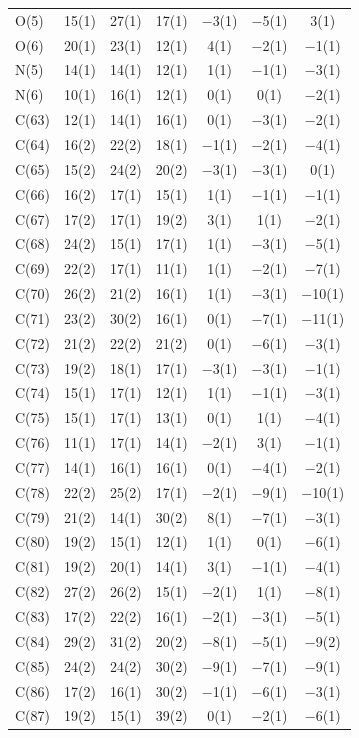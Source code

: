 \begin{center}
{\begin{supertabular}{lcccccc}
O(5)&15(1) &27(1)&17(1) &$-$3(1)&$-$5(1) &3(1)\\
O(6)&20(1) &23(1)&12(1) &4(1)&$-$2(1) &$-$1(1)\\
N(5)&14(1) &14(1)&12(1) &1(1)&$-$1(1) &$-$3(1)\\
N(6)&10(1) &16(1)&12(1) &0(1)&0(1) &$-$2(1)\\
C(63)&12(1) &14(1)&16(1) &0(1)&$-$3(1) &$-$2(1)\\
C(64)&16(2) &22(2)&18(1) &$-$1(1)&$-$2(1) &$-$4(1)\\
C(65)&15(2) &24(2)&20(2) &$-$3(1)&$-$3(1) &0(1)\\
C(66)&16(2) &17(1)&15(1) &1(1)&$-$1(1) &$-$1(1)\\
C(67)&17(2) &17(1)&19(2) &3(1)&1(1) &$-$2(1)\\
C(68)&24(2) &15(1)&17(1) &1(1)&$-$3(1) &$-$5(1)\\
C(69)&22(2) &17(1)&11(1) &1(1)&$-$2(1) &$-$7(1)\\
C(70)&26(2) &21(2)&16(1) &1(1)&$-$3(1) &$-$10(1)\\
C(71)&23(2) &30(2)&16(1) &0(1)&$-$7(1) &$-$11(1)\\
C(72)&21(2) &22(2)&21(2) &0(1)&$-$6(1) &$-$3(1)\\
C(73)&19(2) &18(1)&17(1) &$-$3(1)&$-$3(1) &$-$1(1)\\
C(74)&15(1) &17(1)&12(1) &1(1)&$-$1(1) &$-$3(1)\\
C(75)&15(1) &17(1)&13(1) &0(1)&1(1) &$-$4(1)\\
C(76)&11(1) &17(1)&14(1) &$-$2(1)&3(1) &$-$1(1)\\
C(77)&14(1) &16(1)&16(1) &0(1)&$-$4(1) &$-$2(1)\\
C(78)&22(2) &25(2)&17(1) &$-$2(1)&$-$9(1) &$-$10(1)\\
C(79)&21(2) &14(1)&30(2) &8(1)&$-$7(1) &$-$3(1)\\
C(80)&19(2) &15(1)&12(1) &1(1)&0(1) &$-$6(1)\\
C(81)&19(2) &20(1)&14(1) &3(1)&$-$1(1) &$-$4(1)\\
C(82)&27(2) &26(2)&15(1) &$-$2(1)&1(1) &$-$8(1)\\
C(83)&17(2) &22(2)&16(1) &$-$2(1)&$-$3(1) &$-$5(1)\\
C(84)&29(2) &31(2)&20(2) &$-$8(1)&$-$5(1) &$-$9(2)\\
C(85)&24(2) &24(2)&30(2) &$-$9(1)&$-$7(1) &$-$9(1)\\
C(86)&17(2) &16(1)&30(2) &$-$1(1)&$-$6(1) &$-$3(1)\\
C(87)&19(2) &15(1)&39(2) &0(1)&$-$2(1) &$-$6(1)\\

\end{supertabular}}
\end{center}
